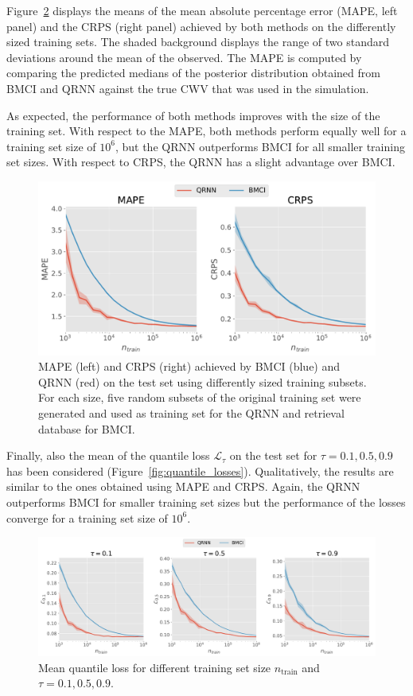 \documentclass[journal abbreviation, manuscript]{copernicus}
\begin{document}
Figure~\ref{fig:mape_crps} displays the means of the mean absolute percentage
error (MAPE, left panel) and the CRPS (right panel) achieved by both methods on
the differently sized training sets. The shaded background displays the range of
two standard deviations around the mean of the observed. The MAPE is computed by
comparing the predicted medians of the posterior distribution obtained from BMCI
and QRNN against the true CWV that was used in the simulation.

As expected, the performance of both methods improves with the size of the
training set. With respect to the MAPE, both methods perform equally well for a
training set size of $10^6$, but the QRNN outperforms BMCI for all smaller
training set sizes. With respect to CRPS, the QRNN has a slight advantage
over BMCI.

  \begin{figure}[hbpt!]
    \centering
    \includegraphics[width = 0.8\linewidth]{../plots/mape_crps}
    \caption{MAPE (left) and CRPS (right) achieved by BMCI (blue) and QRNN (red)
      on the test set using differently sized training subsets. For each size,
      five random subsets of the original training set were generated and used
      as training set for the QRNN and retrieval database for BMCI.}
    \label{fig:mape_crps}
  \end{figure}

Finally, also the mean of the quantile loss $\mathcal{L}_\tau$ on the test set
for $\tau = 0.1, 0.5, 0.9$ has been considered
(Figure~\ref{fig:quantile_losses}). Qualitatively, the results are similar to
the ones obtained using MAPE and CRPS. Again, the QRNN outperforms BMCI for
smaller training set sizes but the performance of the losses converge for
a training set size of $10^6$.

  \begin{figure}[hbpt!]
    \centering
    \includegraphics[width = 0.8\linewidth]{../plots/quantile_losses}
    \caption{Mean quantile loss for different training set size $n_\text{train}$ and
    $\tau = 0.1, 0.5, 0.9$.}
    \label{fig:mape_crps}
  \end{figure}
\end{document}
